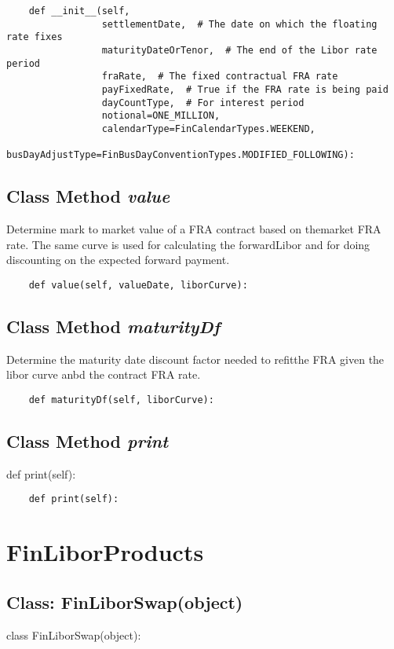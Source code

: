 \documentclass[twoside,11pt]{book}
\begin{document}
\begin{lstlisting}
    def __init__(self,
                 settlementDate,  # The date on which the floating rate fixes
                 maturityDateOrTenor,  # The end of the Libor rate period
                 fraRate,  # The fixed contractual FRA rate
                 payFixedRate,  # True if the FRA rate is being paid
                 dayCountType,  # For interest period
                 notional=ONE_MILLION,
                 calendarType=FinCalendarTypes.WEEKEND,
                 busDayAdjustType=FinBusDayConventionTypes.MODIFIED_FOLLOWING):
\end{lstlisting}

\subsection{Class Method {\it value}}
Determine mark to market value of a FRA contract based on themarket FRA rate. The same curve is used for calculating the forwardLibor and for doing discounting on the expected forward payment. 

\begin{lstlisting}
    def value(self, valueDate, liborCurve):
\end{lstlisting}

\subsection{Class Method {\it maturityDf}}
Determine the maturity date discount factor needed to refitthe FRA given the libor curve anbd the contract FRA rate. 

\begin{lstlisting}
    def maturityDf(self, liborCurve):
\end{lstlisting}

\subsection{Class Method {\it print}}
def print(self):

\begin{lstlisting}
    def print(self):
\end{lstlisting}

\newpage
\section{FinLiborProducts}

\subsection{Class: FinLiborSwap(object)}
class FinLiborSwap(object):
\end{document}
